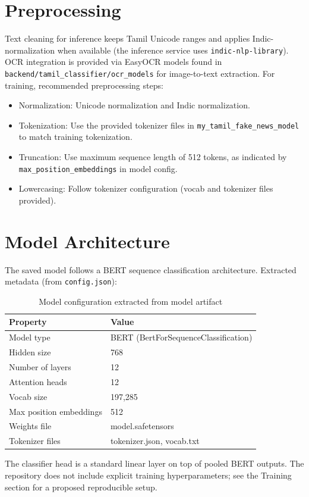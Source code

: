 \documentclass[11pt,a4paper]{article}
\begin{document}
\section{Preprocessing}
Text cleaning for inference keeps Tamil Unicode ranges and applies Indic-normalization when available (the inference service uses \texttt{indic-nlp-library}). OCR integration is provided via EasyOCR models found in \texttt{backend/tamil_classifier/ocr_models} for image-to-text extraction. For training, recommended preprocessing steps:
\begin{itemize}
  \item Normalization: Unicode normalization and Indic normalization.
  \item Tokenization: Use the provided tokenizer files in \texttt{my_tamil_fake_news_model} to match training tokenization.
  \item Truncation: Use maximum sequence length of 512 tokens, as indicated by \texttt{max_position_embeddings} in model config.
  \item Lowercasing: Follow tokenizer configuration (vocab and tokenizer files provided).
\end{itemize}

\section{Model Architecture}
The saved model follows a BERT sequence classification architecture. Extracted metadata (from \texttt{config.json}):
\begin{table}[h]
\centering
\begin{tabular}{ll}
\toprule
Property & Value \\
\midrule
Model type & BERT (BertForSequenceClassification) \\
Hidden size & 768 \\
Number of layers & 12 \\
Attention heads & 12 \\
Vocab size & 197,285 \\
Max position embeddings & 512 \\
Weights file & model.safetensors \\
Tokenizer files & tokenizer.json, vocab.txt \\
\bottomrule
\end{tabular}
\caption{Model configuration extracted from model artifact}
\end{table}

The classifier head is a standard linear layer on top of pooled BERT outputs. The repository does not include explicit training hyperparameters; see the Training section for a proposed reproducible setup.
\end{document}
